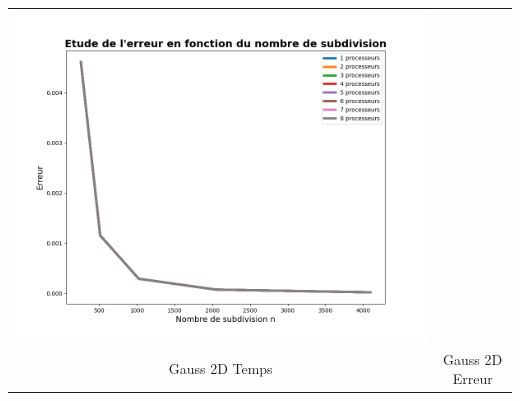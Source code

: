 \documentclass[10pt]{beamer}
\begin{document}
\begin{frame}
\begin{tabular}{cc}
        \includegraphics[width=0.45\linewidth]{Images/error_gauss_Op_MP.png} \\
        Gauss 2D Temps & Gauss 2D Erreur \\
    \end{tabular}
        
\end{frame}
\end{document}
